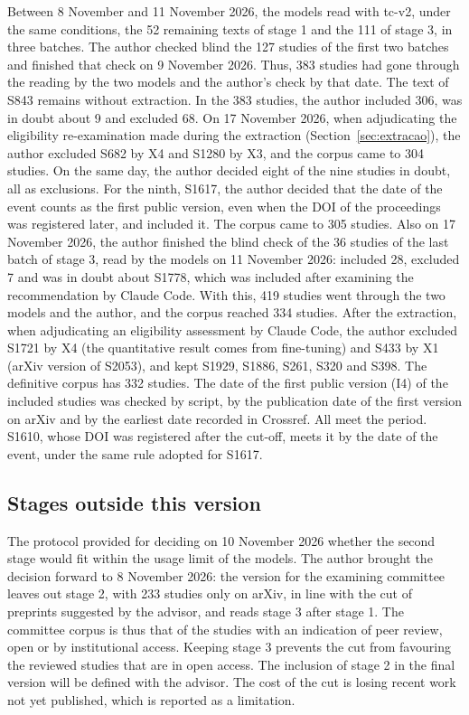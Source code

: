 Between 8 November and 11 November 2026, the models read with tc-v2, under the same conditions, the 52 remaining texts of stage 1 and
the 111 of stage 3, in three batches. The author checked blind the 127 studies of the first two batches and finished that
check on 9 November 2026. Thus, 383 studies had gone through the reading by the two models and the author's check by that date. The text of S843 remains without extraction. In the 383 studies, the author included 306, was
in doubt about 9 and excluded 68. On 17 November 2026, when adjudicating the eligibility re-examination made during the extraction
(Section~\ref{sec:extracao}), the author excluded S682 by X4 and S1280 by X3, and the corpus came to 304 studies. On the same day, the author decided eight of the
nine studies in doubt, all as exclusions. For the ninth, S1617, the author decided that the date of the event counts
as the first public version, even when the DOI of the proceedings was registered later, and included it. The corpus came
to 305 studies. Also on 17 November 2026, the author finished the blind check of the 36 studies of the last batch of
stage 3, read by the models on 11 November 2026: included 28, excluded 7 and was in doubt about S1778, which was included after
examining the recommendation by Claude Code. With this, 419 studies went through the two models and the author, and the
corpus reached 334 studies. After the extraction, when adjudicating an eligibility assessment by Claude Code, the author
excluded S1721 by X4 (the quantitative result comes from fine-tuning) and S433 by X1 (arXiv version of S2053), and kept
S1929, S1886, S261, S320 and S398. The definitive corpus has 332 studies. The date of the
first public version (I4) of the included studies was checked by script, by the publication date of the first version
on arXiv and by the earliest date recorded in Crossref. All meet the period. S1610, whose DOI was registered after the
cut-off, meets it by the date of the event, under the same rule adopted for S1617.

\subsection{Stages outside this version}
The protocol provided for deciding on 10 November 2026 whether the second stage would fit within the usage limit of the models. The author brought
the decision forward to 8 November 2026: the version for the examining committee leaves out stage 2, with 233 studies only on arXiv, in line with the
cut of preprints suggested by the advisor, and reads stage 3 after stage 1. The committee corpus is thus that of the
studies with an indication of peer review, open or by institutional access. Keeping stage 3 prevents the cut
from favouring the reviewed studies that are in open access. The inclusion of stage 2 in the final version will be defined
with the advisor. The cost of the cut is losing recent work not yet published, which is reported as a
limitation.

